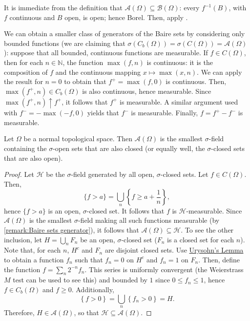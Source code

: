 \begin{remk}\label{remark:Baire sets generator}
		It is immediate from the definition that \(\mathcal{A}(\Omega)\subseteq\mathscr{B}\left(\Omega\right)\): every \(f^{-1}(B)\), with \(f\) continuous and \(B\) open, is open; hence Borel. Then, apply .

		We can obtain a smaller class of generators of the Baire sets by considering only bounded functions (we are claiming that \(\sigma\left(C_b(\Omega)\right)=\sigma\left(C(\Omega)\right)=\mathcal{A}(\Omega)\)): suppose that all bounded, continuous functions are measurable. If \(f\in C(\Omega)\), then for each \(n\in\mathbb{N}\), the function \(\max(f,n)\) is continuous: it is the composition of \(f\) and the continuous mapping \(x\mapsto\max(x,n)\). We can apply the result for \(n=0\) to obtain that \(f^{+}=\max(f,0)\) is continuous. Then, \(\max(f^{+},n)\in C_b(\Omega)\) is also continuous, hence measurable. Since \(\max(f^{+},n)\uparrow f^{+}\), it follows that \(f^{+}\) is measurable. A similar argument used with \(f^{-}=-\max(-f,0)\) yields that \(f^{-}\) is measurable. Finally, \(f=f^{+}-f^{-}\) is measurable.
\end{remk}
\begin{lemm}\label{lemma:Baire sets characterisation}
		Let \(\Omega\) be a normal topological space. Then \(\mathcal{A}(\Omega)\) is the smallest \(\sigma\)-field containing the \(\sigma\)-open sets that are also closed (or equally well, the \(\sigma\)-closed sets that are also open).
\end{lemm}
\begin{proof}
		Let \(\mathcal{H}\) be the \(\sigma\)-field generated by all open, \(\sigma\)-closed sets.
		Let \(f\in C(\Omega)\). Then,
		\[
				\{f>a\}=\bigcup_{n}\left\{f\geq a+\frac{1}{n}\right\}
		,\]
		hence \(\{f>a\}\) is an open, \(\sigma\)-closed set. It follows that \(f\) is \(\mathcal{H}\)-measurable. Since \(\mathcal{A}(\Omega)\) is the smallest \(\sigma\)-field making all such functions measurable (by \cref{remark:Baire sets generator}), it follows that \(\mathcal{A}(\Omega)\subseteq\mathcal{H}\). To see the other inclusion, let \(H=\bigcup_{n}F_n\) be an open, \(\sigma\)-closed set (\(F_n\) is a closed set for each \(n\)). Note that, for each \(n\), \(H^c\) and \(F_n\) are disjoint closed sets. Use \hyperref[Urysohn]{Urysohn's Lemma} to obtain a function \(f_n\) such that \(f_n=0\) on \(H^c\) and \(f_n=1\) on \(F_n\). Then, define the function \(f=\sum_{n} 2^{-n}f_n\). This series is uniformly convergent (the Weierstrass \(M\) test can be used to see this) and bounded by \(1\) since \(0\leq f_n\leq 1\), hence \(f\in C_b(\Omega)\) and \(f\geq 0\). Additionally, 
		\[
				\left\{f>0\right\}=\bigcup_{n}\left\{f_n>0\right\}=H
		.\]
		Therefore, \(H\in\mathcal{A}(\Omega)\), so that \(\mathcal{H}\subseteq\mathcal{A}(\Omega)\).
\end{proof}

